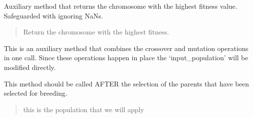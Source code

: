 \documentclass[letterpaper,10pt,english]{sphinxmanual}
\begin{document}
\begin{fulllineitems}

\begin{fulllineitems}
\label{\detokenize{pygenalgo.engines:pygenalgo.engines.generic_ga.GenericGA.best_chromosome}}
\pysigstartsignatures
{}
\pysigstopsignatures
\sphinxAtStartPar
Auxiliary method that returns the chromosome with the
highest fitness value. Safeguarded with ignoring NaNs.
\begin{quote}\begin{description}
\sphinxAtStartPar
Return the chromosome with the highest fitness.

\end{description}\end{quote}

\end{fulllineitems}


\begin{fulllineitems}
\label{\detokenize{pygenalgo.engines:pygenalgo.engines.generic_ga.GenericGA.crossover_mutate}}
\pysigstartsignatures
{}
\pysigstopsignatures
\sphinxAtStartPar
This is an auxiliary method that combines the crossover and mutation
operations in one call. Since these operations happen in place the
‘input\_population’ will be modified directly.

\sphinxAtStartPar
This method should be called AFTER the selection of the parents that
have been selected for breeding.
\begin{quote}\begin{description}
\sphinxAtStartPar
{} \textendash{} this is the population that we will apply


\end{description}
\end{quote}
\end{fulllineitems}
\end{fulllineitems}
\end{document}
